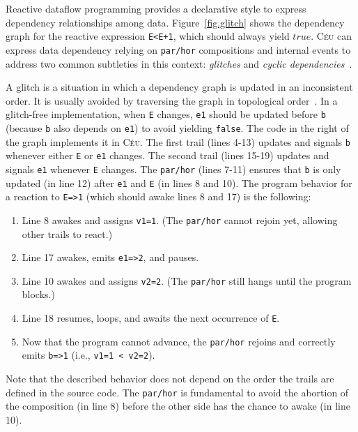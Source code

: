 \documentclass{acm_proc_article-sp}
\newcommand{\CEU}{\textsc{C\'{e}u}\xspace}
\newcommand{\code}[1] {{\small{\texttt{#1}}}}
\newcommand{\1}{\;}
\newcommand{\2}{\;\;}
\newcommand{\3}{\;\;\;}
\newcommand{\5}{\;\;\;\;\;}
\begin{document}
Reactive dataflow programming provides a declarative style to express 
dependency relationships among data.
%
Figure~\ref{fig.glitch} shows the dependency graph for the reactive expression 
\code{E<E+1}, which should always yield $true$.
%
\CEU can express data dependency relying on \code{par/hor} compositions and 
internal events to address two common subtleties in this context: 
\emph{glitches} and \emph{cyclic dependencies}~\cite{frp.survey}.

A glitch is a situation in which a dependency graph is updated in an 
inconsistent order.
It is usually avoided by traversing the graph in topological 
order~\cite{frtime.embedding,frp.survey}.
%
In a glitch-free implementation, when \code{E} changes, \code{e1} should be 
updated before \code{b} (because \code{b} also depends on \code{e1}) to avoid 
yielding \code{false}.
%
The code in the right of the graph implements it in \CEU.
The first trail (lines 4-13) updates and signals \code{b} whenever either 
\code{E} or \code{e1} changes.
The second trail (lines 15-19) updates and signals \code{e1} whenever \code{E} 
changes.
%
The \code{par/hor} (lines 7-11) ensures that \code{b} is only updated (in line 
12) after \code{e1} and \code{E} (in lines 8 and 10).
%
The program behavior for a reaction to \code{E=>1} (which should awake lines 8 
and 17) is the following:

{\small
\begin{enumerate}
\setlength{\itemsep}{0pt}
\item Line 8 awakes and assigns \code{v1=1}.
      (The \code{par/hor} cannot rejoin yet, allowing other trails to react.)
\item Line 17 awakes, emits \code{e1=>2}, and pauses.
\item Line 10 awakes and assigns \code{v2=2}.
      (The \code{par/hor} still hangs until the program blocks.)
\item Line 18 resumes, loops, and awaits the next occurrence of \code{E}.
\item Now that the program cannot advance, the \code{par/hor} rejoins and 
        correctly emits \code{b=>1} (i.e., \code{v1=1 < v2=2}).
\end{enumerate}
}

Note that the described behavior does not depend on the order the trails are 
defined in the source code.
The \code{par/hor} is fundamental to avoid the abortion of the composition (in 
line 8) before the other side has the chance to awake (in line 10).
\end{document}

